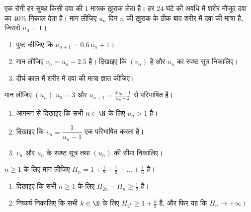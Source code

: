 \begin{exercise}[$\star\star$]\label{exo:g12:seq:7}
एक रोगी हर सुबह किसी दवा की $1$ मात्रक ख़ुराक लेता है। हर 24-घंटे की अवधि
में शरीर मौजूद दवा का $40\%$ निकाल देता है। मान लीजिए $u_n$ दिन $n$ की
ख़ुराक के ठीक बाद शरीर में दवा की मात्रा है, जिससे $u_0 = 1$।
\begin{enumerate}
  \item पुष्ट कीजिए कि $u_{n+1} = 0.6\,u_n + 1$।
  \item मान लीजिए $v_n = u_n - 2.5$ है। दिखाइए कि $(v_n)$  है और $u_n$ का स्पष्ट
        सूत्र निकालिए।
  \item दीर्घ काल में शरीर में दवा की मात्रा ज्ञात कीजिए।
\end{enumerate}
\end{exercise}

\begin{exercise}[$\star\star$]\label{exo:g12:seq:8}
मान लीजिए $(u_n)$ $u_0 = 3$ और $u_{n+1} = \frac{4u_n - 1}{u_n + 2}$ से परिभाषित है।
\begin{enumerate}
  \item आगमन से दिखाइए कि सभी $n \in \N$ के लिए $u_n > 1$ है।
  \item दिखाइए कि $v_n = \dfrac{1}{u_n - 1}$ एक  परिभाषित करता है।
  \item $v_n$ और $u_n$ के स्पष्ट सूत्र तथा $(u_n)$ की सीमा निकालिए।
\end{enumerate}
\end{exercise}

\begin{exercise}[$\star\star\star$]\label{exo:g12:seq:9}
$n \geq 1$ के लिए मान लीजिए $H_n = 1 + \frac{1}{2} + \frac{1}{3} + \dots + \frac{1}{n}$ है।
\begin{enumerate}
  \item दिखाइए कि सभी $n \geq 1$ के लिए $H_{2n} - H_n \geq \frac{1}{2}$ है।
  \item निष्कर्ष निकालिए कि सभी $k \in \N$ के लिए $H_{2^k} \geq 1 + \frac{k}{2}$ है, और फिर यह कि $H_n \to +\infty$।
\end{enumerate}
\end{exercise}

